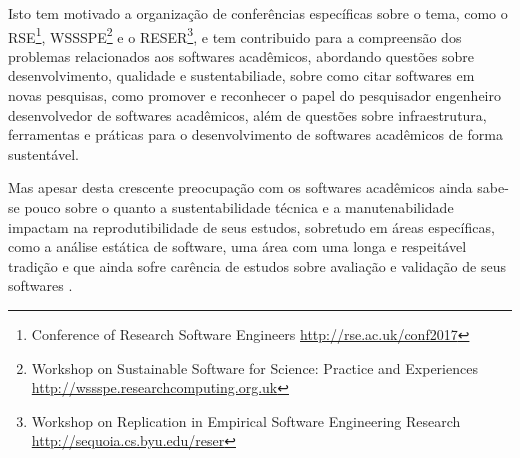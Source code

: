Isto tem motivado a organização de conferências específicas sobre o tema, como
o RSE\footnote{Conference of Research Software Engineers
\url{http://rse.ac.uk/conf2017}}, WSSSPE\footnote{Workshop on Sustainable
Software for Science: Practice and Experiences
\url{http://wssspe.researchcomputing.org.uk}} e o RESER\footnote{Workshop on
Replication in Empirical Software Engineering Research
\url{http://sequoia.cs.byu.edu/reser}}, e tem contribuido para a compreensão
dos problemas relacionados aos softwares acadêmicos, abordando questões sobre
desenvolvimento, qualidade e sustentabiliade, sobre como citar softwares em
novas pesquisas, como promover e reconhecer o papel do pesquisador engenheiro
desenvolvedor de softwares acadêmicos, além de questões sobre infraestrutura,
ferramentas e práticas para o desenvolvimento de softwares acadêmicos de
forma sustentável.

Mas apesar desta crescente preocupação com os softwares acadêmicos ainda
sabe-se pouco sobre o quanto a sustentabilidade técnica e a manutenabilidade
impactam na reprodutibilidade de seus estudos, sobretudo em áreas específicas,
como a análise estática de software, uma área com uma longa e respeitável
tradição e que ainda sofre carência de estudos sobre avaliação e validação de
seus softwares \cite{Li2010, ilyas2016static}.

